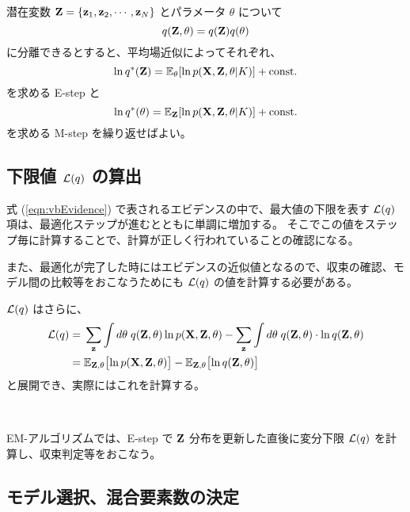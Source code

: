 潜在変数 ${\bf Z} = \{ {\bf z}_1, {\bf z}_2, \cdots, {\bf z}_N \}$ とパラメータ $\theta$ について
\begin{equation}
  q( {\bf Z}, \theta )  =  q( {\bf Z} ) q( \theta )
\end{equation}
に分離できるとすると、平均場近似によってそれぞれ、
\begin{equation}
  \ln q^*({\bf Z})  =  \mathbb{E}_{\theta}[ \ln p({\bf X}, {\bf Z}, \theta | K) ] + {\rm const.}
\end{equation}
を求める E-step と
\begin{equation}
  \ln q^*( \theta )  =  \mathbb{E}_{{\bf Z}}[ \ln p({\bf X}, {\bf Z}, \theta | K) ] + {\rm const.}
\end{equation}
を求める M-step を繰り返せばよい。


\subsection{ 下限値 ${\cal L}(q)$ の算出 }


式 (\ref{eqn:vbEvidence}) で表されるエビデンスの中で、最大値の下限を表す ${\cal L}(q)$ 項は、最適化ステップが進むとともに単調に増加する。
そこでこの値をステップ毎に計算することで、計算が正しく行われていることの確認になる。

また、最適化が完了した時にはエビデンスの近似値となるので、収束の確認、モデル間の比較等をおこなうためにも ${\cal L}(q)$ の値を計算する必要がある。

${\cal L}(q)$ はさらに、
\begin{align}
  {\cal L}(q)  = \;&  \sum_{\bf z} \int d\theta \; q( {\bf Z}, \theta ) \ln p( {\bf X}, {\bf Z}, \theta ) 
  -  \sum_{\bf z} \int d\theta \; q( {\bf Z}, \theta ) \cdot \ln q( {\bf Z}, \theta )  \\
%
  = \;&  \mathbb{E}_{{\bf Z}, \theta}\bigl[\ln p( {\bf X}, {\bf Z}, \theta ) \bigr] - \mathbb{E}_{{\bf Z}, \theta}\bigl[\ln q( {\bf Z}, \theta ) \bigr]  \label{eqn:vbLqExpectation}
\end{align}
と展開でき、実際にはこれを計算する。

\

EM-アルゴリズムでは、E-step で ${\bf Z}$ 分布を更新した直後に変分下限 ${\cal L}(q)$ を計算し、収束判定等をおこなう。

\subsection{ モデル選択、混合要素数の決定 }

